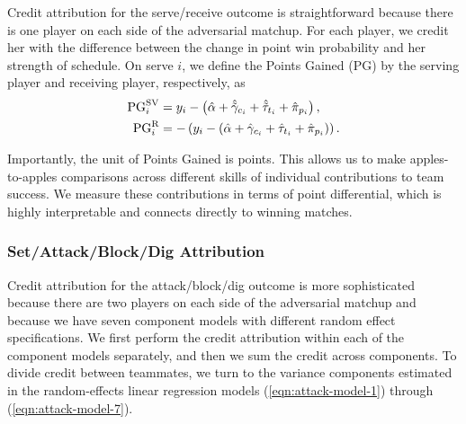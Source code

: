 \documentclass{article}
\begin{document}
Credit attribution for the serve/receive outcome is straightforward because there is one player on each side of the adversarial matchup. For each player, we credit her with the difference between the change in point win probability and her strength of schedule. On serve $i$, we define the Points Gained (PG) by the serving player and receiving player, respectively, as
\begin{align}
    \label{eqn:pg-serve}
    \begin{split}
        \mbox{PG}_i^{\mbox{\scriptsize SV}} &= y_i - \left(\hat\alpha + \hat{\tilde\gamma}_{c_i} + \hat{\tilde\tau}_{t_i} + \hat\pi_{p_i}\right),\\
        \mbox{PG}_i^{\mbox{\scriptsize R}} &= -\left(y_i - \left(\hat\alpha + \hat\gamma_{c_i} + \hat\tau_{t_i} + \hat\pi_{p_i}\right)\right).
    \end{split}
\end{align}

Importantly, the unit of Points Gained is points. This allows us to make apples-to-apples comparisons across different skills of individual contributions to team success. We measure these contributions in terms of point differential, which is highly interpretable and connects directly to winning matches.

\subsubsection{Set/Attack/Block/Dig Attribution}
\label{sec:attribution-attack}

Credit attribution for the attack/block/dig outcome is more sophisticated because there are two players on each side of the adversarial matchup and because we have seven component models with different random effect specifications. We first perform the credit attribution within each of the component models separately, and then we sum the credit across components. To divide credit between teammates, we turn to the variance components estimated in the random-effects linear regression models (\ref{eqn:attack-model-1}) through (\ref{eqn:attack-model-7}).
\end{document}
